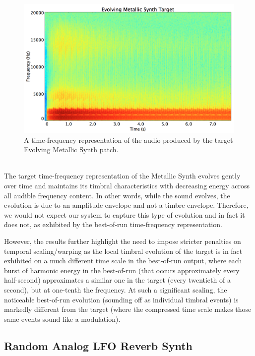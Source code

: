 \documentclass[a4paper,12pt]{report} 	%
\numberwithin{figure}{chapter}
\numberwithin{table}{chapter}
\numberwithin{equation}{chapter}
\begin{document}
\begin{flushleft}
\begin{figure}[h!]
\begin{center}
\includegraphics[scale=0.35,width=\linewidth]{EvolvingMetallicSynthTargetSTFT}
\caption[Target Evolving Metallic Synth Time-Frequency Representation]{A time-frequency representation of the audio produced by the target Evolving Metallic Synth patch.}
\end{center}
\end{figure}
\\
\clearpage
The target time-frequency representation of the Metallic Synth evolves gently over time and maintains its timbral characteristics with decreasing energy across all audible frequency content. In other words, while the sound evolves, the evolution is due to an amplitude envelope and not a timbre envelope. Therefore, we would not expect our system to capture this type of evolution and in fact it does not, as exhibited by the best-of-run time-frequency representation.

However, the results further highlight the need to impose stricter penalties on temporal scaling/warping as the local timbral evolution of the target is in fact exhibited on a much different time scale in the best-of-run output, where each burst of harmonic energy in the best-of-run (that occurs approximately every half-second) approximates a similar one in the target (every twentieth of a second), but at one-tenth the frequency. At such a significant scaling, the noticeable best-of-run evolution (sounding off as individual timbral events) is markedly different from the target (where the compressed time scale makes those same events sound like a modulation).

\subsection{Random Analog LFO Reverb Synth}


\end{flushleft}
\end{document}
